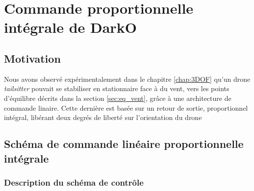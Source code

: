 \chapter{Commande proportionnelle intégrale de DarkO}
\minitoc
\label{chap:6DOF}

\section{Motivation}
\label{sec:motivation6DOF}
Nous avons observé expérimentalement dans le chapitre \ref{chap:3DOF} qu'un drone \textit{tailsitter} pouvait se stabiliser en stationnaire face à du vent, vers les points d'équilibre décrits dans la section \ref{sec:eq_vent}, grâce à une architecture de commande linaire. Cette dernière est basée sur un retour de sortie, proportionnel intégral, libérant deux degrés de liberté sur l'orientation du drone 


\section{Schéma de commande linéaire proportionnelle intégrale}
\label{sec:6dofcmd}
\subsection{Description du schéma de contrôle}
\label{sec:ctl_sche}

